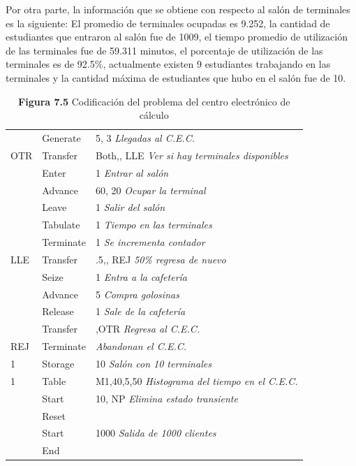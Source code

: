 \documentclass[11pt,letterpaper]{report}
\begin{document}
Por otra parte, la información que se obtiene con respecto al salón de
terminales es la siguiente: El promedio de terminales ocupadas es
9.252, la cantidad de estudiantes que entraron al salón fue de 1009, el
tiempo promedio de utilización de las terminales fue de 59.311 minutos,
el porcentaje de utilización de las terminales es de 92.5\%,
actualmente existen 9 estudiantes trabajando en las terminales y la
cantidad máxima de estudiantes que hubo en el salón fue de 10.

\begin{table}[H]
\centering
\caption*{\textbf{Figura 7.5} Codificación del problema del centro electrónico de cálculo}
\begin{tabular}{lll}
\toprule
 & Generate & 5, 3 \quad \textit{Llegadas al C.E.C.} \\
OTR & Transfer & Both,, LLE \quad \textit{Ver si hay terminales disponibles} \\
 & Enter & 1 \quad \textit{Entrar al salón} \\
 & Advance & 60, 20 \quad \textit{Ocupar la terminal} \\
 & Leave & 1 \quad \textit{Salir del salón} \\
 & Tabulate & 1 \quad \textit{Tiempo en las terminales} \\
 & Terminate & 1 \quad \textit{Se incrementa contador} \\
LLE & Transfer & .5,, REJ \quad \textit{50\% regresa de nuevo} \\
 & Seize & 1 \quad \textit{Entra a la cafetería} \\
 & Advance & 5 \quad \textit{Compra golosinas} \\
 & Release & 1 \quad \textit{Sale de la cafetería} \\
 & Transfer & ,OTR \quad \textit{Regresa al C.E.C.} \\
REJ & Terminate & \quad \textit{Abandonan el C.E.C.} \\
1 & Storage & 10 \quad \textit{Salón con 10 terminales} \\
1 & Table & M1,40,5,50 \quad \textit{Histograma del tiempo en el C.E.C.} \\
 & Start & 10, NP \quad \textit{Elimina estado transiente} \\
 & Reset & \\
 & Start & 1000 \quad \textit{Salida de 1000 clientes} \\
 & End & \\
\bottomrule
\end{tabular}
\end{table}
\end{document}
